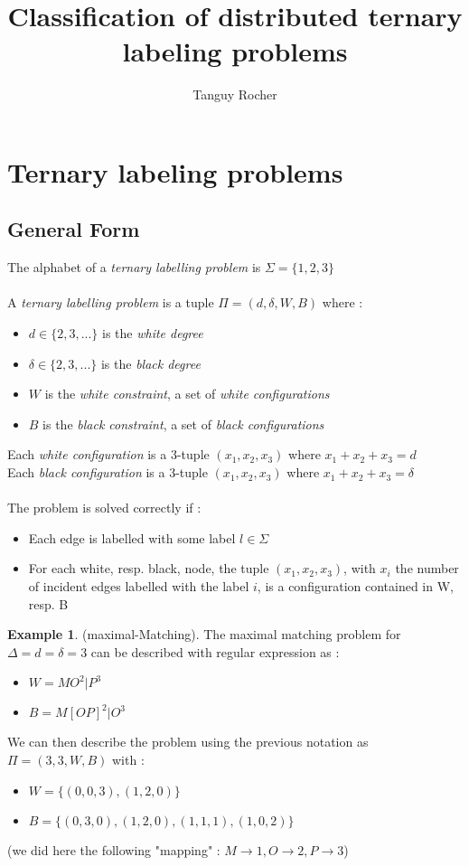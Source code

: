 \documentclass{article}
\title{Classification of distributed ternary labeling problems}
\author{Tanguy Rocher}
\theoremstyle{definition}
\newtheorem{exmp}{Example}[section]
\newcommand{\wdd}[0]{d}
\newcommand{\bdd}[0]{\delta}
\begin{document}
\maketitle

\section{Ternary labeling problems}
\subsection{General Form}
The alphabet of a \textit{ternary labelling problem} is $\Sigma = \{1,2,3\}$\\\\
A \textit{ternary labelling problem} is a tuple $\Pi = (\wdd,\bdd,W,B)$ where :
\begin{itemize}
    \item $\wdd\in\{2,3,...\}$ is the \textit{white degree}
    \item $\bdd\in\{2,3,...\}$ is the \textit{black degree}
    \item $W$ is the \textit{white constraint}, a set of \textit{white configurations}
    \item $B$ is the \textit{black constraint}, a set of \textit{black configurations}
\end{itemize}
Each \textit{white configuration} is a 3-tuple $(x_1,x_2,x_3)$ where $x_1+x_2+x_3 = \wdd$\\
Each \textit{black configuration} is a 3-tuple $(x_1,x_2,x_3)$ where $x_1+x_2+x_3 = \bdd$\\\\
The problem is solved correctly if :
\begin{itemize}
    \item Each edge is labelled with some label $l\in\Sigma$
    \item For each white, resp. black, node, the tuple $(x_1,x_2, x_3)$, with $x_i$ the number of incident edges labelled with the label $i$, is a configuration contained in W, resp. B
\end{itemize}
\begin{exmp}
(maximal-Matching). The maximal matching problem for $\Delta = \wdd = \bdd = 3$ can be described with regular expression as :
\begin{itemize}
    \item $W = MO^{2}|P^{3}$
    \item $B = M[OP]^{2}|O^{3}$
\end{itemize}
We can then describe the problem using the previous notation as
$\Pi = (3,3,W,B)$ with :
\begin{itemize}
    \item $W = \{(0,0,3),(1, 2, 0)\}$
    \item $B = \{(0,3,0),(1,2,0),(1,1,1),(1,0,2)\}$
\end{itemize}
(we did here the following "mapping" : $M\rightarrow 1, O\rightarrow 2, P\rightarrow 3$)
\end{exmp}
\end{document}
